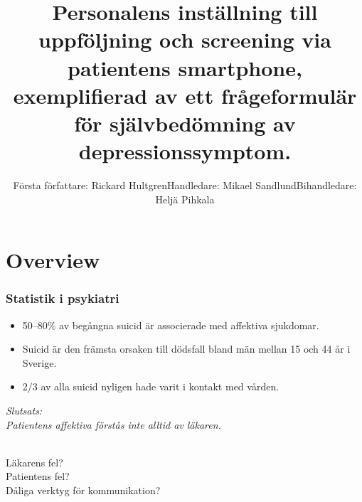 \documentclass[english]{beamer}
\begin{document}
\title{Personalens inställning till uppföljning och screening via patientens smartphone, exemplifierad av ett frågeformulär för självbedömning av depressionssymptom.}
\author[]{Första författare: Rickard Hultgren\newline Handledare: Mikael Sandlund\newline Bihandledare: Heljä Pihkala}


\begin{frame}
	\titlepage
\end{frame}


\section{Overview}
\begin{frame}
	\frametitle{Statistik i psykiatri}

	\begin{itemize}
	\item 50--80\% av begångna suicid är associerade med affektiva sjukdomar.
	\item Suicid är den främsta orsaken till dödsfall bland män mellan 15 och 44 år i Sverige.
	\item 2/3 av alla suicid nyligen hade varit i kontakt med vården.
	\end{itemize}

	\pause

	\textit{Slutsats:\\Patientens affektiva förstås inte alltid av läkaren.}\\\ \\

\pause

Läkarens fel?\\
Patientens fel?\\
Dåliga verktyg för kommunikation?
\end{frame}
\end{document}
